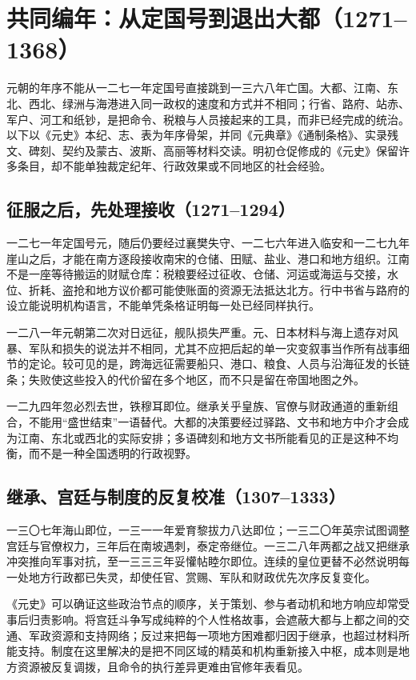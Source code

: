 \section{共同编年：从定国号到退出大都（1271--1368）}

元朝的年序不能从一二七一年定国号直接跳到一三六八年亡国。大都、江南、东北、西北、绿洲与海港进入同一政权的速度和方式并不相同；行省、路府、站赤、军户、河工和纸钞，是把命令、税粮与人员接起来的工具，而非已经完成的统治。以下以《元史》本纪、志、表为年序骨架，并同《元典章》《通制条格》、实录残文、碑刻、契约及蒙古、波斯、高丽等材料交读。明初仓促修成的《元史》保留许多条目，却不能单独裁定纪年、行政效果或不同地区的社会经验。

\subsection{征服之后，先处理接收（1271--1294）}

一二七一年定国号元，随后仍要经过襄樊失守、一二七六年进入临安和一二七九年崖山之后，才能在南方逐段接收南宋的仓储、田赋、盐业、港口和地方组织。江南不是一座等待搬运的财赋仓库：税粮要经过征收、仓储、河运或海运与交接，水位、折耗、盗抢和地方议价都可能使账面的资源无法抵达北方。行中书省与路府的设立能说明机构语言，不能单凭条格证明每一处已经同样执行。

\label{evt:yuan-japan-1281}
一二八一年元朝第二次对日远征，舰队损失严重。元、日本材料与海上遗存对风暴、军队和损失的说法并不相同，尤其不应把后起的单一灾变叙事当作所有战事细节的定论。较可见的是，跨海远征需要船只、港口、粮食、人员与沿海征发的长链条；失败使这些投入的代价留在多个地区，而不只是留在帝国地图之外。

一二九四年忽必烈去世，铁穆耳即位。继承关乎皇族、官僚与财政通道的重新组合，不能用“盛世结束”一语替代。大都的决策要经过驿路、文书和地方中介才会成为江南、东北或西北的实际安排；多语碑刻和地方文书所能看见的正是这种不均衡，而不是一种全国透明的行政视野。

\subsection{继承、宫廷与制度的反复校准（1307--1333）}

一三〇七年海山即位，一三一一年爱育黎拔力八达即位；一三二〇年英宗试图调整宫廷与官僚权力，三年后在南坡遇刺，泰定帝继位。一三二八年两都之战又把继承冲突推向军事对抗，至一三三三年妥懽帖睦尔即位。连续的皇位更替不必然说明每一处地方行政都已失灵，却使任官、赏赐、军队和财政优先次序反复变化。

《元史》可以确证这些政治节点的顺序，关于策划、参与者动机和地方响应却常受事后归责影响。将宫廷斗争写成纯粹的个人性格故事，会遮蔽大都与上都之间的交通、军政资源和支持网络；反过来把每一项地方困难都归因于继承，也超过材料所能支持。制度在这里解决的是把不同区域的精英和机构重新接入中枢，成本则是地方资源被反复调拨，且命令的执行差异更难由官修年表看见。

